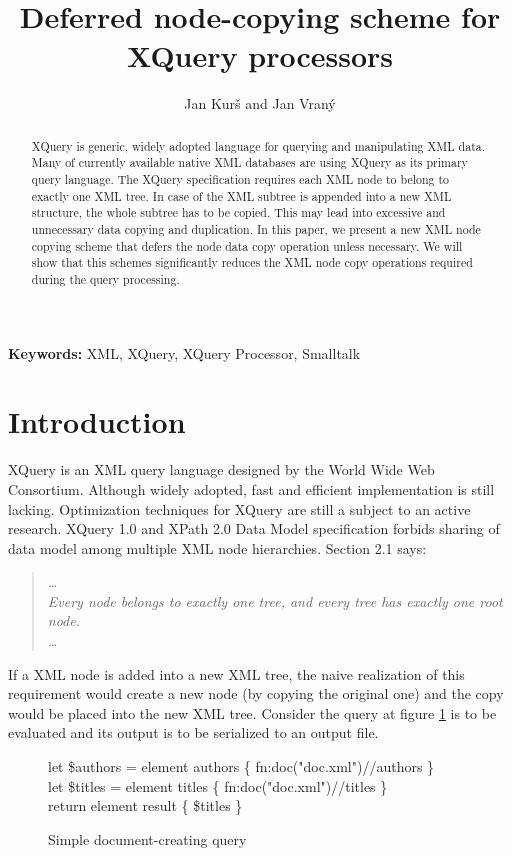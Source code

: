 \documentclass{llncs}
\title{Deferred node-copying scheme for XQuery processors}
\author{Jan Kur\v{s} and Jan Vran\'{y}}
\institute{Software Engineering Group, FIT \v{C}VUT,
\\ Kolejní 550/2, 160 00, Prague, Czech Republic
\\ \email{kurs.jan@post.cz, jan.vrany@fit.cvut.cz}}
\begin{document}
\maketitle

\begin{abstract}
XQuery is generic, widely adopted language for querying and 
manipulating XML data.  Many of currently available native 
XML databases are using XQuery as its primary query language.
%
The XQuery specification requires each XML node to belong to exactly 
one XML tree. In case of the XML subtree is appended into a new
XML structure, the whole subtree has to be copied. This may lead into 
excessive and unnecessary data copying and duplication.
%
In this paper, we present a new XML node copying scheme that defers 
the node data copy operation unless necessary. We will show that this 
schemes significantly reduces the XML node copy operations required 
during the query processing. 

\end{abstract}

{\small {\bf Keywords:} XML, XQuery, XQuery Processor, Smalltalk}


\section{Introduction}
\label{sec:intro}
XQuery is an XML query language designed by the World Wide Web Consortium.
Although widely adopted, fast and efficient implementation
is still lacking. Optimization techniques for XQuery are still a subject 
to an active research. 
XQuery 1.0 and XPath 2.0 Data Model specification \cite{W3CXDM} forbids 
sharing of data model among multiple XML node hierarchies. Section 2.1 says:
\begin{quote}
 {\em\dots\\
 Every node belongs to exactly one tree, and every tree has exactly one 
 root node.\\
 \dots}   
\end{quote}
\noindent
If a XML node is added into a new XML tree, the naive realization of this 
requirement would create a new node (by copying the original one) and the
copy would be placed into the new XML tree.
Consider the query at figure \ref{fig:query:simple-document-creating-query} 
is to be evaluated and its output is to be serialized to an output file. 
      
    \begin{figure}[h]
      \centering
        \begin{code}
            \lineno let \$authors = element authors \{ fn:doc("doc.xml")//authors \}\\
            \lineno let \$titles  = element titles  \{ fn:doc("doc.xml")//titles \}\\
            \lineno return element result \{ \$titles \}
        \end{code}
      \caption{Simple document-creating query}
      \label{fig:query:simple-document-creating-query}
    \end{figure}
    
\end{document}
